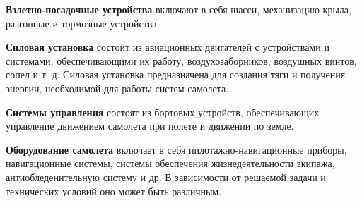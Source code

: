 	\textbf{Взлетно-посадочные устройства} включают в себя шасси, механизацию крыла, разгонные и тормозные устройства.\par
	\textbf{Силовая установка} состоит из авиационных двигателей с устройствами и системами, обеспечивающими их работу, воздухозаборников, воздушных винтов, сопел и т. д. Силовая установка предназначена для создания тяги и получения энергии, необходимой для работы систем самолета.\par
	\textbf{Системы управления} состоят из бортовых устройств, обеспечивающих управление движением самолета при полете и движении по земле.\par
	\textbf{Оборудование самолета} включает в себя пилотажно-навигационные приборы, навигационные системы, системы обеспечения жизнедеятельности экипажа, антиобледенительную систему и др. В зависимости от решаемой задачи и технических условий оно может быть различным.
	

